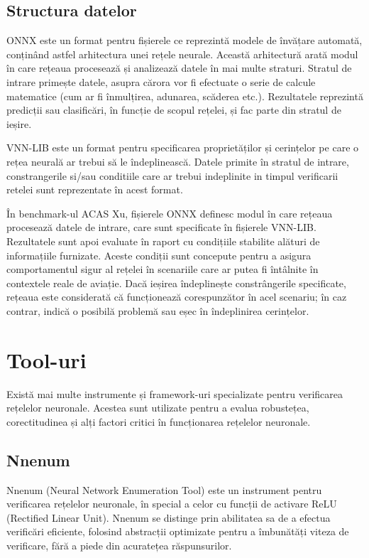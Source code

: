 \documentclass[12pt,a4paper]{article}
\begin{document}
\subsection{Structura datelor}

ONNX este un format pentru fișierele ce reprezintă modele de învățare automată, conținând astfel arhitectura unei rețele neurale. Această arhitectură arată modul în care rețeaua procesează și analizează datele în mai multe straturi. Stratul de intrare primește datele, asupra cărora vor fi efectuate o serie de calcule matematice (cum ar fi înmulțirea, adunarea, scăderea etc.). Rezultatele reprezintă predicții sau clasificări, în funcție de scopul rețelei, și fac parte din stratul de ieșire.

VNN-LIB este un format pentru specificarea proprietăților și cerințelor pe care o rețea neurală ar trebui să le îndeplinească. Datele primite în stratul de intrare, constrangerile si/sau conditiile care ar trebui indeplinite in timpul verificarii retelei sunt reprezentate în acest format.

În benchmark-ul ACAS Xu, fișierele ONNX definesc modul în care rețeaua procesează datele de intrare, care sunt specificate în fișierele VNN-LIB. Rezultatele sunt apoi evaluate în raport cu condițiile stabilite alături de informațiile furnizate. Aceste condiții sunt concepute pentru a asigura comportamentul sigur al rețelei în scenariile care ar putea fi întâlnite în contextele reale de aviație. Dacă ieșirea îndeplinește constrângerile specificate, rețeaua este considerată că funcționează corespunzător în acel scenariu; în caz contrar, indică o posibilă problemă sau eșec în îndeplinirea cerințelor.
\section{Tool-uri}
Există mai multe instrumente și framework-uri specializate pentru verificarea rețelelor neuronale. Acestea sunt utilizate pentru a evalua robustețea, corectitudinea și alți factori critici în funcționarea rețelelor neuronale.

\subsection{Nnenum}
Nnenum (Neural Network Enumeration Tool) este un instrument pentru verificarea rețelelor neuronale, în special a celor cu funcții de activare ReLU (Rectified Linear Unit). Nnenum se distinge prin abilitatea sa de a efectua verificări eficiente, folosind abstracții optimizate pentru a îmbunătăți viteza de verificare, fără a piede din acuratețea răspunsurilor.\cite{nnenum}
\end{document}

